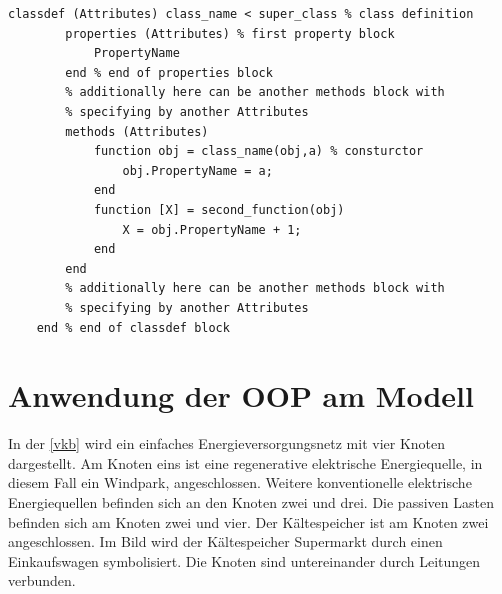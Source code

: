 \begin{lstlisting}[float=h!,frame=none]
	classdef (Attributes) class_name < super_class % class definition
		properties (Attributes) % first property block
			PropertyName
		end % end of properties block
		% additionally here can be another methods block with 
		% specifying by another Attributes
		methods (Attributes) 
			function obj = class_name(obj,a) % consturctor
				obj.PropertyName = a;
			end
			function [X] = second_function(obj)
				X = obj.PropertyName + 1;
			end
		end
		% additionally here can be another methods block with 
		% specifying by another Attributes
	end % end of classdef block
\end{lstlisting}


\section{Anwendung der OOP am Modell}

In der \cref{vkb} wird ein einfaches Energieversorgungsnetz mit vier Knoten
dargestellt. Am Knoten eins ist eine regenerative elektrische Energiequelle, in
diesem Fall ein Windpark, angeschlossen. Weitere konventionelle elektrische
Energiequellen befinden sich an den Knoten zwei und drei. Die passiven Lasten
befinden sich am Knoten zwei und vier. Der Kältespeicher ist am Knoten zwei
angeschlossen. Im Bild wird der Kältespeicher Supermarkt durch einen
Einkaufswagen symbolisiert. Die Knoten sind untereinander durch Leitungen
verbunden.


